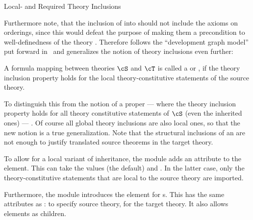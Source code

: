 \begin{omgroup}[id=complex-theories,short=Complex Theories,
                            creators=miko,contributors=frabe]
\begin{omgroup}[id=restricting-inference,short=Local/Required Theory Inclusions]{Local- and
  Required Theory Inclusions}
\begin{module}[id=restinf]
Furthermore note, that the inclusion of {} into {}
should not include the {} axioms on orderings, since this would defeat the
purpose of making them a precondition to well-definedness of the theory
{}. Therefore \omdoc follows the ``development graph model'' put
forward in~\cite{Hutter:mocsv00} and generalizes the notion of theory inclusions even
further:
\begin{definition}[display=flow,id=local.theory.inclusion]
  A formula mapping between theories $\cS$ and $\cT$ is called a
   or , if the theory
  inclusion property holds for the local theory-constitutive statements of the source
  theory.
\end{definition}
\begin{omtext}
  To distinguish this from the notion of a proper {} --- where
  the theory inclusion property holds for all theory constitutive statements of $\cS$
  (even the inherited ones) --- . Of
  course all global theory inclusions are also local ones, so that the new notion is a
  true generalization. Note that the structural inclusions of an
  {} are not enough to justify translated source theorems in the
  target theory.
\end{omtext}

\begin{omtext}
  To allow for a local variant of inheritance, the {} module adds an
  attribute  to the  element. This can take
  the values  (the default) and
  . In the latter case, only the theory-constitutive
  statements that are local to the source theory are imported.
\end{omtext}

\begin{definition}[id=axiom-inclusion.def]
  Furthermore, the {} module introduces the {}
  element for {s}. This has the same attributes as
  :  to specify source
  theory,  for the target theory. It also allows
   elements as children.
\end{definition}
\end{module}
\end{omgroup}



\end{omgroup}
